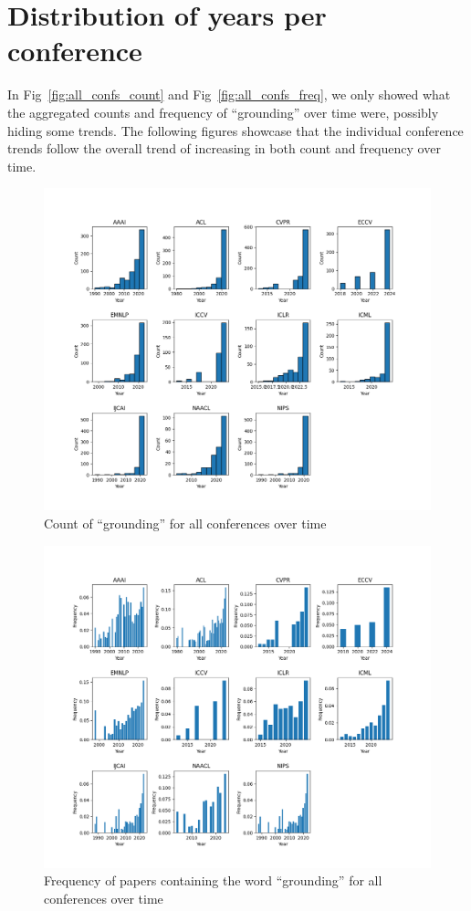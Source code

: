 \documentclass[11pt]{article}
\begin{document}
\section{Distribution of years per conference}
\label{sec:appendix_years}
In Fig~\ref{fig:all_confs_count} and Fig~\ref{fig:all_confs_freq}, we only showed what the aggregated counts and frequency of ``grounding'' over time were, possibly hiding some trends. The following figures showcase that the individual conference trends follow the overall trend of increasing in both count and frequency over time.

\begin{figure}[h]
  \includegraphics[width=0.6\linewidth]{figs/year_distribution/split_by_conf_grounding_dist.png} 
  \centering
  \caption {Count of ``grounding'' for all conferences over time}
\end{figure}

\begin{figure}[h]
  \includegraphics[width=0.6\linewidth]{figs/year_distribution_freq/split_by_conf_grounding_dist.png} 
  \centering
  \caption {Frequency of papers containing the word ``grounding'' for all conferences over time}
\end{figure}

\clearpage
\end{document}

